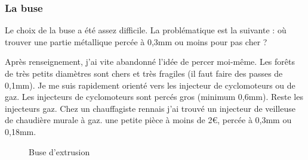 \subsubsection{La buse}%
Le choix de la buse a été assez difficile. La problématique est la suivante : où trouver %
une partie métallique percée à 0,3mm ou moins pour pas cher ? \par%
Après renseignement, j'ai vite abandonné l'idée de percer moi-même. Les forêts de très petits %
diamètres sont chers et très fragiles (il faut faire des passes de 0,1mm).%
Je me suis rapidement orienté vers les injecteur de cyclomoteurs ou de gaz. Les injecteurs de %
cyclomoteurs sont percés gros (minimum 0,6mm). Reste les injecteurs gaz. Chez un chauffagiste %
rennais j'ai trouvé un injecteur de veilleuse de chaudière murale à gaz. une petite pièce à %
moins de 2\euro, percée à 0,3mm ou 0,18mm.
\begin{figure}%
   \caption{\label{buse} Buse d'extrusion}%
\end{figure}%